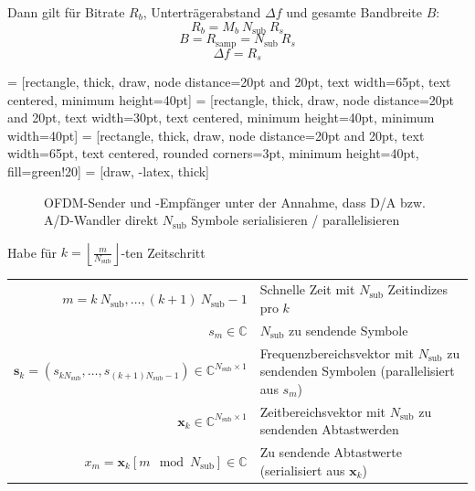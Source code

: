 \documentclass[a4paper, 11pt]{article}
\begin{document}
Dann gilt für Bitrate $R_b$, Unterträgerabstand $\Delta f$ und gesamte Bandbreite $B$:
\[
	R_b = M_b ~ N_{\mathrm{sub}} ~ R_s
\]
\[
	B = R_{\mathrm{samp}} = N_{\mathrm{sub}} ~ R_s
\]
\[
	\Delta f = R_s
\]

 = [rectangle, thick, draw, node distance=20pt and 20pt, text width=65pt, text centered, minimum height=40pt]
 = [rectangle, thick, draw, node distance=20pt and 20pt, text width=30pt, text centered, minimum height=40pt, minimum width=40pt]
 = [rectangle, thick, draw, node distance=20pt and 20pt, text width=65pt, text centered, rounded corners=3pt, minimum height=40pt, fill=green!20]
 = [draw, -latex, thick]

\begin{figure}[H]
	\centering
	\caption*{OFDM-Sender und -Empfänger unter der Annahme, dass D/A bzw. A/D-Wandler direkt $N_{\mathrm{sub}}$ Symbole serialisieren / parallelisieren}
\end{figure}

Habe für $k = \left \lfloor \frac{m}{N_{\mathrm{sub}}} \right \rfloor$-ten Zeitschritt
\begin{center}
\begin{tabular}{r p{9cm}}
	$m = k ~ N_{\mathrm{sub}}, \ldots, (k + 1) ~ N_{\mathrm{sub}} - 1$ & Schnelle Zeit mit $N_{\mathrm{sub}}$ Zeitindizes pro $k$ \\
	$s_m \in \mathbb C$ & $N_\mathrm{sub}$ zu sendende Symbole \\
	$\mathbf s_k = (s_{k N_\mathrm{sub}}, \ldots, s_{(k + 1) N_\mathrm{sub} - 1}) \in \mathbb C^{N_\mathrm{sub} \times 1}$ & Frequenzbereichsvektor mit $N_{\mathrm{sub}}$ zu sendenden Symbolen (parallelisiert aus $s_m$) \\
	$\mathbf x_k \in \mathbb C^{N_\mathrm{sub} \times 1}$ & Zeitbereichsvektor mit $N_{\mathrm{sub}}$ zu sendenden Abtastwerden \\
	$x_m = \mathbf x_k[m \mod N_{\mathrm{sub}}] \in \mathbb C$ & Zu sendende Abtastwerte (serialisiert aus $\mathbf x_k$) \\
\end{tabular}
\end{center}
\end{document}
